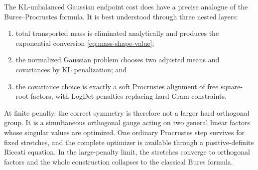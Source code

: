 \documentclass[11pt]{article}
\theoremstyle{definition}
\theoremstyle{remark}
\begin{document}
The KL-unbalanced Gaussian endpoint cost does have a precise analogue of the
Bures--Procrustes formula. It is best understood through three nested layers:
\begin{enumerate}[leftmargin=2em]
 \item total transported mass is eliminated analytically and produces the
 exponential conversion \eqref{eq:mass-shape-value};
 \item the normalized Gaussian problem chooses two adjusted means and
 covariances by KL penalization; and
 \item the covariance choice is exactly a soft Procrustes alignment of free
 square-root factors, with LogDet penalties replacing hard Gram constraints.
\end{enumerate}
At finite penalty, the correct symmetry is therefore not a larger hard
orthogonal group. It is a simultaneous orthogonal gauge acting on two general
linear factors whose singular values are optimized. One ordinary Procrustes
step survives for fixed stretches, and the complete optimizer is available
through a positive-definite Riccati equation. In the large-penalty limit, the
stretches converge to orthogonal factors and the whole construction collapses
to the classical Bures formula.



\end{document}

